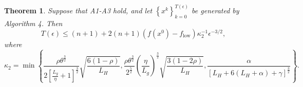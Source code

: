 \documentclass[11pt]{article}
\newtheorem{theorem}{Theorem}[section]
\begin{document}
\begin{theorem}
\label{thm:edg}
Suppose that A1-A3 hold, and let $\left\{x^{k}\right\}_{k=0}^{T(\epsilon)}$ be generated by Algorithm 4. Then
\begin{equation}
T(\epsilon)\leq (n+1)+2(n+1)\left(f(x^{0})-f_{\mathrm{low}}\right)\kappa_{2}^{-1}\epsilon^{-3/2},
\label{eq:edg17}
\end{equation}
where
\small
\begin{equation}
\kappa_{2}=\min\left\{\frac{\rho\theta^{\frac{3}{2}}}{2\left[\frac{L_{g}}{\eta}+1\right]^{\frac{3}{2}}}\sqrt{\frac{6(1-\rho)}{L_{H}}},\frac{\rho\theta^{\frac{3}{2}}}{2^{\frac{5}{2}}}\left(\frac{\eta}{L_{g}}\right)^{\frac{3}{2}}\sqrt{\frac{3(1-2\rho)}{L_{H}}},\frac{\alpha}{\left[L_{H}+6(L_{H}+\alpha)+\gamma\right]^{\frac{3}{2}}}\right\}.
\label{eq:edg18}
\end{equation}
\normalsize
\end{theorem}
\end{document}
